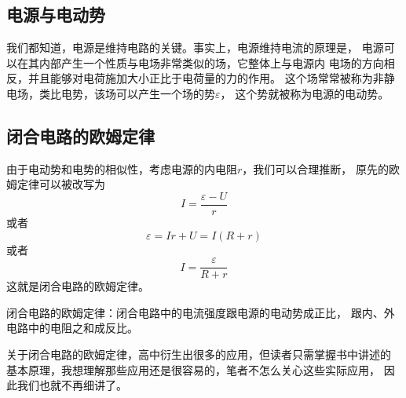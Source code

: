 \subsection{电源与电动势}
我们都知道，电源是维持电路的关键。事实上，电源维持电流的原理是，
电源可以在其内部产生一个性质与电场非常类似的场，它整体上与电源内
电场的方向相反，并且能够对电荷施加大小正比于电荷量的力的作用。
这个场常常被称为非静电场，类比电势，该场可以产生一个场的势$\varepsilon$，
这个势就被称为电源的电动势。
\subsection{闭合电路的欧姆定律}
由于电动势和电势的相似性，考虑电源的内电阻$r$，我们可以合理推断，
原先的欧姆定律可以被改写为
\begin{equation}
    I=\frac{\varepsilon-U}{r}
\end{equation}
或者 
\begin{equation}
    \varepsilon=Ir+U=I(R+r)
\end{equation}
或者 
\begin{equation}
    I=\frac{\varepsilon}{R+r}
\end{equation}
这就是闭合电路的欧姆定律。
\begin{theorem}
    闭合电路的欧姆定律：闭合电路中的电流强度跟电源的电动势成正比，
    跟内、外电路中的电阻之和成反比。
\end{theorem}

关于闭合电路的欧姆定律，高中衍生出很多的应用，但读者只需掌握书中讲述的
基本原理，我想理解那些应用还是很容易的，笔者不怎么关心这些实际应用，
因此我们也就不再细讲了。